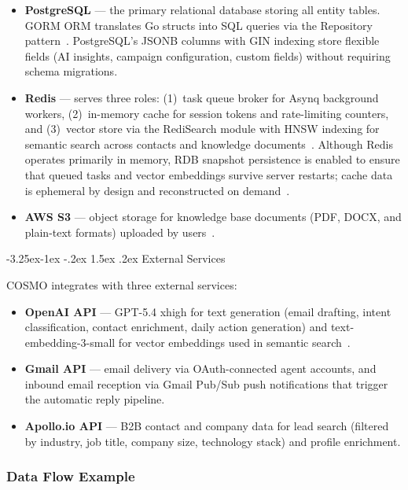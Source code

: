 \documentclass[a4paper]{article}
\makeatletter
\newcounter {subsubsubsection}[subsubsection]
\newcommand\subsubsubsection{\@startsection{subsubsubsection}{4}{\z@}%
	{-3.25ex\@plus -1ex \@minus -.2ex}%
	{1.5ex \@plus .2ex}%
	{\normalfont\normalsize\bfseries}}
\makeatother
\begin{document}
\begin{itemize}
    \item \textbf{PostgreSQL} --- the primary relational database 
    storing all entity tables. GORM ORM translates Go structs into 
    SQL queries via the Repository 
    pattern~\cite{postgresql_jsonb}. PostgreSQL's JSONB columns 
    with GIN indexing store flexible fields (AI insights, campaign 
    configuration, custom fields) without requiring schema 
    migrations.
    \item \textbf{Redis} --- serves three roles: (1)~task queue 
    broker for Asynq background workers, (2)~in-memory cache for 
    session tokens and rate-limiting counters, and (3)~vector store 
    via the RediSearch module with HNSW indexing for semantic search 
    across contacts and knowledge 
    documents~\cite{redis_vectorsearch}. Although Redis operates 
    primarily in memory, RDB snapshot persistence is enabled to 
    ensure that queued tasks and vector embeddings survive server 
    restarts; cache data is ephemeral by design and reconstructed 
    on demand~\cite{redis_docs}.
    \item \textbf{AWS S3} --- object storage for knowledge base 
    documents (PDF, DOCX, and plain-text formats) uploaded by 
    users~\cite{aws_s3_docs}.
\end{itemize}

\subsubsubsection{External Services}

COSMO integrates with three external services:

\begin{itemize}
    \item \textbf{OpenAI API} --- GPT-5.4 xhigh for text generation 
    (email drafting, intent classification, contact enrichment, 
    daily action generation) and text-embedding-3-small for vector embeddings used in semantic search~\cite{openai_embeddings}.
    \item \textbf{Gmail API} --- email delivery via OAuth-connected 
    agent accounts, and inbound email reception via Gmail Pub/Sub 
    push notifications that trigger the automatic reply pipeline.
    \item \textbf{Apollo.io API} --- B2B contact and company data 
    for lead search (filtered by industry, job title, company size, 
    technology stack) and profile enrichment.
\end{itemize}

\subsubsection{Data Flow Example}
\end{document}
